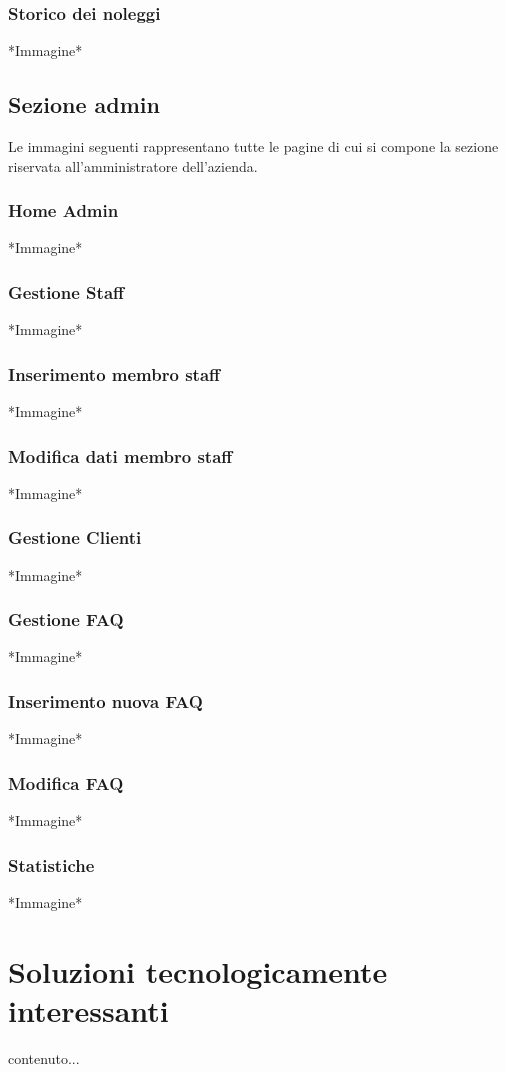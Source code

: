 \documentclass[12pt,a4paperS]{report}
\begin{document}
\begin{normalsize}
			\subsection{Storico dei noleggi}
				*Immagine*
				
		\section{Sezione admin}
			Le immagini seguenti rappresentano tutte le pagine di cui si compone la sezione riservata all'amministratore dell'azienda.
			
			\subsection{Home Admin}
				*Immagine*
			
			\subsection{Gestione Staff}
				*Immagine*
			
			\subsection{Inserimento membro staff}
				*Immagine*
			
			\subsection{Modifica dati membro staff}
				*Immagine*
			
			\subsection{Gestione Clienti}
				*Immagine*
		
			\subsection{Gestione FAQ}
				*Immagine*
			
			\subsection{Inserimento nuova FAQ}
				*Immagine*
			
			\subsection{Modifica FAQ}
				*Immagine*
			
			\subsection{Statistiche}
				*Immagine*
			
	\end{normalsize}
	
	\hypertarget{soluzioni}{\chapter{Soluzioni tecnologicamente interessanti}}
	\label{soluzioni}
	\begin{normalsize}
		contenuto...
	\end{normalsize}
\end{document}
